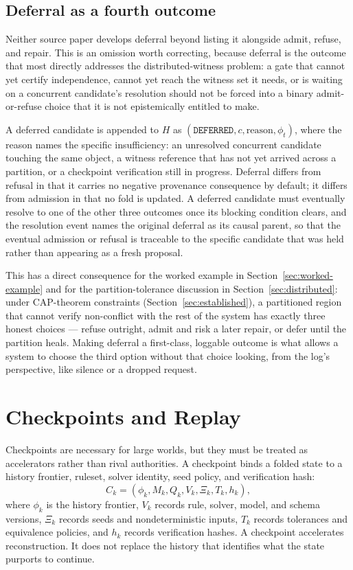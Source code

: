 \documentclass[11pt]{article}
\begin{document}
\subsection{Deferral as a fourth outcome}
\label{sec:deferral}

Neither source paper develops deferral beyond listing it alongside admit, refuse, and repair. This is an omission worth correcting, because deferral is the outcome that most directly addresses the distributed-witness problem: a gate that cannot yet certify independence, cannot yet reach the witness set it needs, or is waiting on a concurrent candidate's resolution should not be forced into a binary admit-or-refuse choice that it is not epistemically entitled to make.

A deferred candidate is appended to $H$ as $(\texttt{DEFERRED}, c, \text{reason}, \phi_t)$, where the reason names the specific insufficiency: an unresolved concurrent candidate touching the same object, a witness reference that has not yet arrived across a partition, or a checkpoint verification still in progress. Deferral differs from refusal in that it carries no negative provenance consequence by default; it differs from admission in that no fold is updated. A deferred candidate must eventually resolve to one of the other three outcomes once its blocking condition clears, and the resolution event names the original deferral as its causal parent, so that the eventual admission or refusal is traceable to the specific candidate that was held rather than appearing as a fresh proposal.

This has a direct consequence for the worked example in Section~\ref{sec:worked-example} and for the partition-tolerance discussion in Section~\ref{sec:distributed}: under CAP-theorem constraints (Section~\ref{sec:established}), a partitioned region that cannot verify non-conflict with the rest of the system has exactly three honest choices — refuse outright, admit and risk a later repair, or defer until the partition heals. Making deferral a first-class, loggable outcome is what allows a system to choose the third option without that choice looking, from the log's perspective, like silence or a dropped request.

\section{Checkpoints and Replay}
\label{sec:checkpoints}

Checkpoints are necessary for large worlds, but they must be treated as accelerators rather than rival authorities. A checkpoint binds a folded state to a history frontier, ruleset, solver identity, seed policy, and verification hash:
\[
C_k = (\phi_k, M_k, Q_k, V_k, \Xi_k, T_k, h_k),
\]
where $\phi_k$ is the history frontier, $V_k$ records rule, solver, model, and schema versions, $\Xi_k$ records seeds and nondeterministic inputs, $T_k$ records tolerances and equivalence policies, and $h_k$ records verification hashes. A checkpoint accelerates reconstruction. It does not replace the history that identifies what the state purports to continue.
\end{document}
